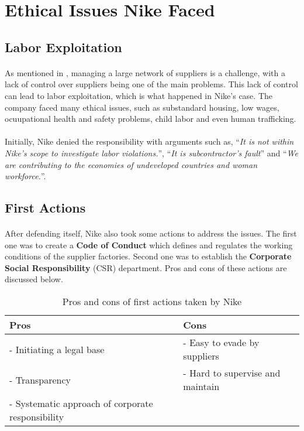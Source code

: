 \section{Ethical Issues Nike Faced}

\subsection{Labor Exploitation}

\paragraph{} As mentioned in \textsl{}, managing a large network of suppliers is a challenge, with a lack of control over suppliers being one of the main problems. This lack of control can lead to labor exploitation, which is what happened in Nike's case. The company faced many ethical issues, such as substandard housing, low wages, ocuupational health and safety problems, child labor and even human trafficking.

\paragraph{} Initially, Nike denied the responsibility with arguments such as, \enquote{\textit{It is not within Nike’s scope to investigate labor violations.}}, \enquote{\textit{It is subcontractor's fault}} and \enquote{\textit{We are contributing to the economies of undeveloped countries and woman workforce.}}. 

\subsection{First Actions}

\paragraph{} After defending itself, Nike also took some actions to address the issues. The first one was to create a \textbf{Code of Conduct} which defines and regulates the working conditions of the supplier factories. Second one was to establish the \textbf{Corporate Social Responsibility} (CSR) department. Pros and cons of these actions are discussed below.

\begin{table}[H]
    \centering
    \begin{tabular}{|l|l|}
        \hline
        Pros & Cons \\
        \hline
        - Initiating a legal base & - Easy to evade by suppliers \\
        - Transparency & - Hard to supervise and maintain \\
        - Systematic approach of corporate responsibility & \\
        \hline
    \end{tabular}
    \caption{Pros and cons of first actions taken by Nike}
    \label{tab:first-actions}
\end{table}

